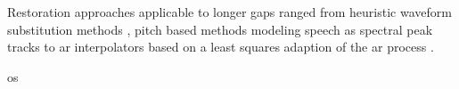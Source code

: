 Restoration approaches applicable to longer gaps ranged from heuristic waveform substitution methods \cite{Goodman1986}\cite{Niediwiecki2001}, pitch based methods modeling speech as spectral peak tracks \cite{Maher1994}\cite{McAulay1986} to \DIFdelbegin {}\DIFdelend \DIFaddbegin \gls{ar} \DIFaddend interpolators \cite{Esquef2006} based on a least squares adaption of the \DIFdelbegin {}\DIFdelend \DIFaddbegin \gls{ar} \DIFaddend process \cite{Godsill1998book}.

\DIFaddbegin {}\linebreak[0]\linebreak[0]\gls{os} \DIFaddend %





